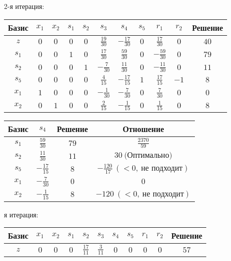\documentclass{article}%
\begin{document}
\begin{flushleft}
2{-}я итерация: %
\newline%
\newline%
\renewcommand{\arraystretch}{1.3}%
\begin{tabular}{|c|ccccccccc|c|}%
\hline%
Базис&$x_{1}$&$x_{2}$&$s_{1}$&$s_{2}$&$s_{3}$&$s_{4}$&$s_{5}$&$r_{1}$&$r_{2}$&Решение\\%
\hline%
$z$&$0$&$0$&$0$&$0$&$\frac{19}{30}$&$-\frac{17}{30}$&$0$&$\frac{17}{30}$&$0$&$40$\\%
\hline%
$s_{1}$&$0$&$0$&$1$&$0$&$\frac{17}{30}$&$\frac{59}{30}$&$0$&$-\frac{59}{30}$&$0$&$79$\\%
$s_{2}$&$0$&$0$&$0$&$1$&$-\frac{7}{30}$&$\frac{11}{30}$&$0$&$-\frac{11}{30}$&$0$&$11$\\%
$s_{5}$&$0$&$0$&$0$&$0$&$\frac{4}{15}$&$-\frac{17}{15}$&$1$&$\frac{17}{15}$&$-1$&$8$\\%
$x_{1}$&$1$&$0$&$0$&$0$&$-\frac{1}{30}$&$-\frac{7}{30}$&$0$&$\frac{7}{30}$&$0$&$0$\\%
$x_{2}$&$0$&$1$&$0$&$0$&$\frac{2}{15}$&$-\frac{1}{15}$&$0$&$\frac{1}{15}$&$0$&$8$\\%
\hline%
\end{tabular}%
\newline%
\newline%
\newline%
\begin{tabular}{|cccc|}%
\hline%
Базис&$s_{4}$&Решение&Отношение\\%
\hline%
$s_{1}$&$\frac{59}{30}$&$79$&$\frac{2370}{59}$\\%
$s_{2}$&$\frac{11}{30}$&$11$&$30\: \text{(Оптимально)}$\\%
$s_{5}$&$-\frac{17}{15}$&$8$&$-\frac{120}{17}\: (< 0, \: \text{не подходит})$\\%
$x_{1}$&$-\frac{7}{30}$&$0$&$0$\\%
$x_{2}$&$-\frac{1}{15}$&$8$&$-120\: (< 0, \: \text{не подходит})$\\%
\hline%
\end{tabular}%
\newline%
\newline%
я итерация: %
\newline%
\newline%
\renewcommand{\arraystretch}{1.3}%
\begin{tabular}{|c|ccccccccc|c|}%
\hline%
Базис&$x_{1}$&$x_{2}$&$s_{1}$&$s_{2}$&$s_{3}$&$s_{4}$&$s_{5}$&$r_{1}$&$r_{2}$&Решение\\%
\hline%
$z$&$0$&$0$&$0$&$\frac{17}{11}$&$\frac{3}{11}$&$0$&$0$&$0$&$0$&$57$\\%

\end{tabular}
\end{flushleft}
\end{document}
